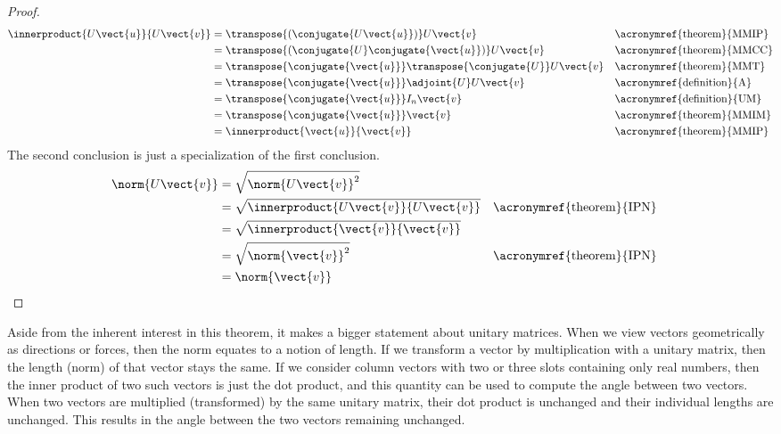 %
\begin{proof}
%
\begin{align*}
\innerproduct{U\vect{u}}{U\vect{v}}
&=\transpose{\left(\conjugate{U\vect{u}}\right)}U\vect{v}
&&\text{\acronymref{theorem}{MMIP}}\\
%
&=\transpose{\left(\conjugate{U}\conjugate{\vect{u}}\right)}U\vect{v}
&&\text{\acronymref{theorem}{MMCC}}\\
%
&=\transpose{\conjugate{\vect{u}}}\transpose{\conjugate{U}}U\vect{v}
&&\text{\acronymref{theorem}{MMT}}\\
%
&=\transpose{\conjugate{\vect{u}}}\adjoint{U}U\vect{v}
&&\text{\acronymref{definition}{A}}\\
%
&=\transpose{\conjugate{\vect{u}}}I_n\vect{v}
&&\text{\acronymref{definition}{UM}}\\
%
&=\transpose{\conjugate{\vect{u}}}\vect{v}
&&\text{\acronymref{theorem}{MMIM}}\\
%
&=\innerproduct{\vect{u}}{\vect{v}}
&&\text{\acronymref{theorem}{MMIP}}
%
\end{align*}
%
The second conclusion is just a specialization of the first conclusion.
%
\begin{align*}
\norm{U\vect{v}}
&=\sqrt{\norm{U\vect{v}}^2}\\
&=\sqrt{\innerproduct{U\vect{v}}{U\vect{v}}}&&\text{\acronymref{theorem}{IPN}}\\
&=\sqrt{\innerproduct{\vect{v}}{\vect{v}}}\\
&=\sqrt{\norm{\vect{v}}^2}&&\text{\acronymref{theorem}{IPN}}\\
&=\norm{\vect{v}}
\end{align*}
%
\end{proof}
%
Aside from the inherent interest in this theorem, it makes a bigger statement about unitary matrices.  When we view vectors geometrically as directions or forces, then the norm equates to a notion of length.  If we transform a vector by multiplication with a unitary matrix, then the length (norm) of that vector stays the same.  If we consider column vectors with two or three slots containing only real numbers, then the inner product of two such vectors is just the dot product, and this quantity can be used to compute the angle between two vectors.  When two vectors are multiplied (transformed) by the same unitary matrix, their dot product is unchanged and their individual lengths are unchanged.  This results in the angle between the two vectors remaining unchanged.\par
%
